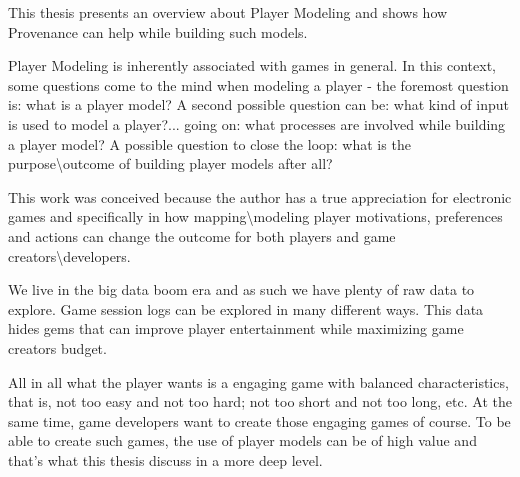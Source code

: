 \begin{foreignabstract}
This thesis presents an overview about Player Modeling and shows how Provenance can help while building such models.

Player Modeling is inherently associated with games in general. In this context, some questions come to the mind when modeling a player - the foremost question is: what is a player model? A second possible question can be: what kind of input is used to model a player?... going on: what processes are involved while building a player model? A possible question to close the loop: what is the purpose\textbackslash{}outcome of building player models after all?

This work was conceived because the author has a true appreciation for electronic games and specifically in how mapping\textbackslash{}modeling player motivations, preferences and actions can change the outcome for both players and game creators\textbackslash{}developers.

We live in the big data boom era and as such we have plenty of raw data to explore. Game session logs can be explored in many different ways. This data hides gems that can improve player entertainment while maximizing game creators budget.

All in all what the player wants is a engaging game with balanced characteristics, that is, not too easy and not too hard; not too short and not too long, etc. At the same time, game developers want to create those engaging games of course. To be able to create such games, the use of player models can be of high value and that's what this thesis discuss in a more deep level.
\end{foreignabstract}